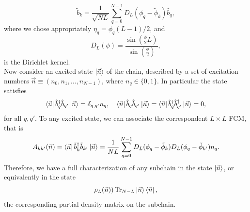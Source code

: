 \begin{equation}
\tilde{b}_k = \frac{1}{\sqrt{NL}}\sum_{q=0}^{N-1} D_{L}(\phi_q-\tilde{\phi}_k) \hat{b}_q,
\label{CH2:From_L_to_N}
\end{equation}
where we chose appropriately  $\eta_q = \phi_q(L-1)/2$, and
\begin{equation}
D_{L}(\phi) = \frac{\sin\left(\frac{\phi}{2}L\right) }{\sin\left(\frac{\phi}{2}\right)},
\end{equation}
is the Dirichlet kernel\cite{bashirov_chapter_2014}.\\
\indent Now consider an excited state $\mathinner{|{\vec{n}}\rangle}$ of the chain, described by a set of excitation numbers $\vec{n}\equiv (n_0,n_1,\ldots, n_{N-1})$, where $n_q\in \{0,1\}$. In particular the state satisfies
\begin{equation}
\mathinner{\langle{\vec{n}}|}\hat{b}^{\dagger}_{q}\hat{b}_{q'}\mathinner{|{\vec{n}}\rangle} = \delta_{q,q'}n_q,\quad \mathinner{\langle{\vec{n}}|}\hat{b}_{q}\hat{b}_{q'}\mathinner{|{\vec{n}}\rangle} = \mathinner{\langle{\vec{n}}|}\hat{b}^{\dagger}_{q}\hat{b}^{\dagger}_{q'}\mathinner{|{\vec{n}}\rangle} = 0,
\end{equation}
for all $q,q'$. To any excited state, we can associate the correspondent $L\times L$ FCM, that is
\begin{equation}
A_{kk'}(\vec{n}) = \mathinner{\langle{\vec{n}}|}\tilde{b}^{\dagger}_k \tilde{b}_{k'}\mathinner{|{\vec{n}}\rangle} = \frac{1}{NL}\sum_{q=0}^{N-1}D_{L}(\phi_q-\tilde{\phi}_k)D_L(\phi_q-\tilde{\phi}_{k'})n_q.
\end{equation}
Therefore, we have a full characterization of any subchain in the state $\mathinner{|{\vec{n}}\rangle}$, or equivalently in the state
\begin{equation}
\rho_L(\vec{n}) ) \operatorname{Tr}_{N-L} \mathinner{|{\vec{n}}\rangle}\mathinner{\langle{\vec{n}}|},
\end{equation}
the corresponding partial density matrix on the subchain.
